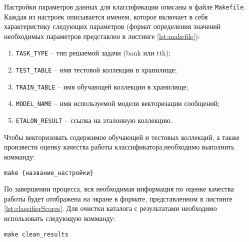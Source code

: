             Настройки параметров данных для классификации описаны в файле {\tt Makefile}.
            Каждая из настроек описывается именем, которое включает в себя
            характеристику следующих параметров (формат определения значений необходимых
            параметров представлен в листинге \ref{lst:makefile}):

            \begin{enumerate}
                \item {\tt TASK\_TYPE} -- тип решаемой задачи ({bank} или {ttk});
                \item {\tt TEST\_TABLE} -- имя тестовой коллекции в хранилище;
                \item {\tt TRAIN\_TABLE} -- имя обучающей коллекции в хранилище;
                \item {\tt MODEL\_NAME} -- имя используемой модели векторизации сообщений;
                \item {\tt ETALON\_RESULT} -- ссылка на эталонную коллекцию.
            \end{enumerate}

            \lstset{style=bash}
            

            Чтобы векторизовать содержимое обучающей и тестовых коллекций, а также
            произвести оценку качества работы классификатора,необходимо выполнить
            комманду:
            \begin{center}
                {\tt make {\{название\_настройки\}}}
            \end{center}

            По завершении процесса, вся необходимая информация по оценке качества
            работы будет отображена на экране в формате, представленном в листинге
            \ref{lst:classifierScores}.
            Для очистки каталога с результатами необходимо использовать следующую
            комманду:
            \begin{center}
                {\tt make clean\_results}
            \end{center}

